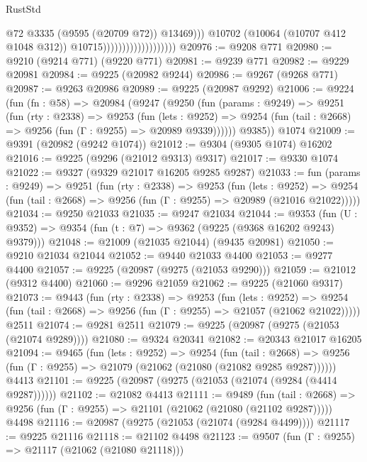 \begin{lexlean}{RustStd}
\begin{coremodule}
                                                @72
                                                @3335
                                                (@9595 (@20709 @72))
                                                @13469)))
                                          @10702
                                          (@10064 (@10707 @412 @1048 @312))
                                          @10715)))))))))))))))))))
@20976 := @9208 @771
@20980 := @9210 (@9214 @771) (@9220 @771)
@20981 := @9239 @771
@20982 := @9229 @20981
@20984 := @9225 (@20982 @9244)
@20986 := @9267 (@9268 @771)
@20987 := @9263 @20986
@20989 := @9225 (@20987 @9292)
@21006 := @9224
    (fun (fn : @58) =>
    @20984
      (@9247
        (@9250
          (fun (params : @9249) =>
          @9251
            (fun (rty : @2338) =>
            @9253
              (fun (lets : @9252) =>
              @9254 (fun (tail : @2668) => @9256 (fun (Γ : @9255) => @20989 @9339))))))
        @9385))
    @1074
@21009 := @9391 (@20982 (@9242 @1074))
@21012 := @9304 (@9305 @1074) @16202
@21016 := @9225 (@9296 (@21012 @9313) @9317)
@21017 := @9330 @1074
@21022 := @9327 (@9329 @21017 @16205 @9285 @9287)
@21033 := fun (params : @9249) =>
  @9251
    (fun (rty : @2338) =>
    @9253
      (fun (lets : @9252) =>
      @9254 (fun (tail : @2668) => @9256 (fun (Γ : @9255) => @20989 (@21016 @21022)))))
@21034 := @9250 @21033
@21035 := @9247 @21034
@21044 := @9353
    (fun (U : @9352) => @9354 (fun (t : @7) => @9362 (@9225 (@9368 @16202 @9243) @9379)))
@21048 := @21009 (@21035 @21044) (@9435 @20981)
@21050 := @9210 @21034 @21044
@21052 := @9440 @21033 @4400
@21053 := @9277 @4400
@21057 := @9225 (@20987 (@9275 (@21053 @9290)))
@21059 := @21012 (@9312 @4400)
@21060 := @9296 @21059
@21062 := @9225 (@21060 @9317)
@21073 := @9443
    (fun (rty : @2338) =>
    @9253
      (fun (lets : @9252) =>
      @9254 (fun (tail : @2668) => @9256 (fun (Γ : @9255) => @21057 (@21062 @21022)))))
    @2511
@21074 := @9281 @2511
@21079 := @9225 (@20987 (@9275 (@21053 (@21074 @9289))))
@21080 := @9324 @20341
@21082 := @20343 @21017 @16205
@21094 := @9465
    (fun (lets : @9252) =>
    @9254
      (fun (tail : @2668) =>
      @9256 (fun (Γ : @9255) => @21079 (@21062 (@21080 (@21082 @9285 @9287))))))
    @4413
@21101 := @9225 (@20987 (@9275 (@21053 (@21074 (@9284 (@4414 @9287))))))
@21102 := @21082 @4413
@21111 := @9489
    (fun (tail : @2668) => @9256 (fun (Γ : @9255) => @21101 (@21062 (@21080 (@21102 @9287)))))
    @4498
@21116 := @20987 (@9275 (@21053 (@21074 (@9284 @4499))))
@21117 := @9225 @21116
@21118 := @21102 @4498
@21123 := @9507 (fun (Γ : @9255) => @21117 (@21062 (@21080 @21118)))

\end{coremodule}
\end{lexlean}
